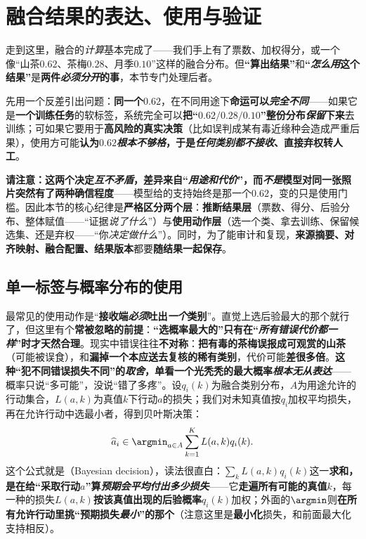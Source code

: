 \section{融合结果的表达、使用与验证}
\label{sec:knowledge-fusion-result-use}

走到这里，融合的\emph{计算}基本完成了——我们手上有了票数、加权得分，或一个像“山茶$0.62$、茶梅$0.28$、月季$0.10$”这样的融合分布。但\textbf{“算出结果”}和\textbf{“\emph{怎么用}这个结果”}是\textbf{两件\emph{必须分开}的事}，本节专门处理后者。

先用一个反差引出问题：\textbf{同一个$0.62$}，在不同用途下\textbf{命运可以\emph{完全不同}}——如果它是\textbf{一个训练任务}的软标签，系统完全可以\textbf{把“$0.62/0.28/0.10$”整份分布\emph{保留}下来}去训练；可如果它要用于\textbf{高风险的真实决策}（比如误判成某有毒近缘种会造成严重后果），使用方可能\textbf{认为$0.62$\emph{根本不够格}，于是\emph{任何类别都不接收}、直接弃权转人工}。

\textbf{请注意：这两个决定\emph{互不矛盾}，差异来自“\emph{用途和代价}”，而\emph{不是}模型对同一张照片突然有了两种确信程度}——模型给的支持始终是那一个$0.62$，变的只是使用门槛。因此本节的核心纪律是\textbf{严格区分两个层}：\textbf{推断结果层}（票数、得分、后验分布、整体赋值——“证据\emph{说了什么}”）与\textbf{使用动作层}（选一个类、拿去训练、保留候选集、还是弃权——“你\emph{决定做什么}”）。同时，为了能审计和复现，\textbf{来源摘要、对齐映射、融合配置、结果版本}都要\textbf{随结果一起保存}。

\subsection{单一标签与概率分布的使用}
\label{sec:knowledge-fusion-label-probability-use}

最常见的使用动作是“\textbf{接收端\emph{必须}吐出\emph{一个}类别}”。直觉上选后验最大的那个就行了，但这里有个\textbf{常被忽略的前提}：\textbf{“选概率最大的”只有在“\emph{所有错误\emph{代价都一样}}”时才天然合理}。现实中错误往往\textbf{不对称}：\textbf{把有毒的茶梅误报成可观赏的山茶}（可能被误食），和\textbf{漏掉一个本应送去复核的稀有类别}，代价可能\textbf{差很多倍}。\textbf{这种“犯不同错误损失不同”的\emph{取舍}，单看一个光秃秃的最大概率\emph{根本无从表达}}——概率只说“多可能”，没说“错了多疼”。设$q_i(k)$为融合类别分布，$A$为用途允许的行动集合，$L(a,k)$为真值$k$下行动$a$的损失；我们对未知真值按$q_i$加权平均损失，再在允许行动中选最小者，得到贝叶斯决策：
\begin{equation}
  \widehat a_i
  \in\argmin_{a\in A}
  \sum_{k=1}^{K}L(a,k)q_i(k).
  \label{eq:knowledge-fusion-bayes-decision}
\end{equation}
这个公式就是（Bayesian decision），读法很直白：$\sum_k L(a,k)q_i(k)$这一\textbf{求和，是在给“采取行动$a$”算\emph{预期会\emph{平均}付出多少损失}}——它\textbf{走遍所有可能的真值$k$}，每一种的损失$L(a,k)$\textbf{按该真值出现的后验概率}$q_i(k)$加权；外面的$\argmin$则\textbf{在所有允许行动里挑“预期损失\emph{最小}”的那个}（注意这里是\textbf{最小化}损失，和前面最大化支持相反）。

